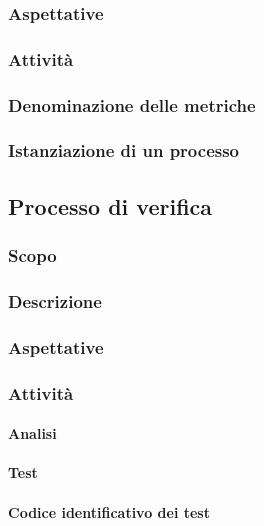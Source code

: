 \subsubsection{Aspettative}

\subsubsection{Attività}

\subsubsection{Denominazione delle metriche}

\subsubsection{Istanziazione di un processo}

\subsection{Processo di verifica}

\subsubsection{Scopo}

\subsubsection{Descrizione}

\subsubsection{Aspettative}

\subsubsection{Attività}

\paragraph{Analisi}

\paragraph{Test}

\paragraph{Codice identificativo dei test}

